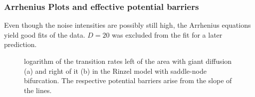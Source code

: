 \documentclass[12pt,a4paper]{article}
\begin{document}
\subsubsection{Arrhenius Plots and effective potential barriers}
Even though the noise intensities are possibly still high, the Arrhenius equations yield good fits of the data. $D=20$ was excluded from the fit for a later prediction.
\begin{figure}[H]
	\hspace*{-0.5cm}
	\caption{logarithm of the transition rates left of the area with giant diffusion (a) and right of it (b) in the Rinzel model with saddle-node bifurcation. The respective potential barriers arise from the slope of the lines.}
	\label{arrhplotsrinzel}
\end{figure}
\end{document}
